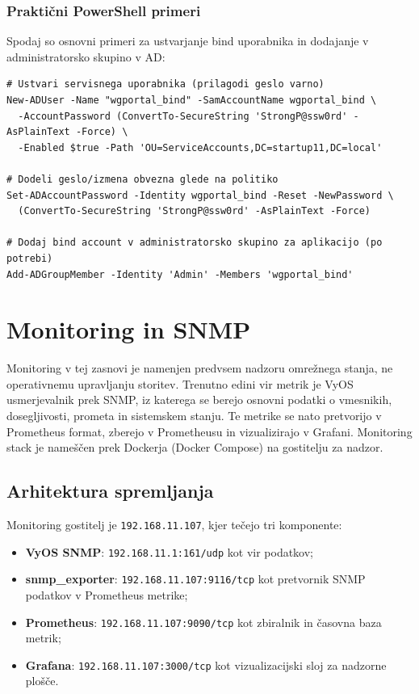 \documentclass[a4paper,11pt]{article}
\begin{document}
\subsubsection{Praktični PowerShell primeri}
Spodaj so osnovni primeri za ustvarjanje bind uporabnika in dodajanje v administratorsko skupino v AD:
\begin{lstlisting}
# Ustvari servisnega uporabnika (prilagodi geslo varno)
New-ADUser -Name "wgportal_bind" -SamAccountName wgportal_bind \
  -AccountPassword (ConvertTo-SecureString 'StrongP@ssw0rd' -AsPlainText -Force) \
  -Enabled $true -Path 'OU=ServiceAccounts,DC=startup11,DC=local'

# Dodeli geslo/izmena obvezna glede na politiko
Set-ADAccountPassword -Identity wgportal_bind -Reset -NewPassword \
  (ConvertTo-SecureString 'StrongP@ssw0rd' -AsPlainText -Force)

# Dodaj bind account v administratorsko skupino za aplikacijo (po potrebi)
Add-ADGroupMember -Identity 'Admin' -Members 'wgportal_bind'
\end{lstlisting}


\section{Monitoring in SNMP}
Monitoring v tej zasnovi je namenjen predvsem nadzoru omrežnega stanja, ne operativnemu upravljanju storitev. Trenutno edini vir metrik je VyOS usmerjevalnik prek SNMP,
iz katerega se berejo osnovni podatki o vmesnikih, dosegljivosti, prometa in sistemskem stanju. Te metrike se nato pretvorijo v Prometheus format, zberejo v Prometheusu in vizualizirajo v Grafani. 
Monitoring stack je nameščen prek Dockerja (Docker Compose) na gostitelju za nadzor.

\subsection{Arhitektura spremljanja}
Monitoring gostitelj je 
\texttt{192.168.11.107}, kjer tečejo tri komponente:
\begin{itemize}
  \item \textbf{VyOS SNMP}: \texttt{192.168.11.1:161/udp} kot vir podatkov;
  \item \textbf{snmp\_exporter}: \texttt{192.168.11.107:9116/tcp} kot pretvornik SNMP podatkov v Prometheus metrike;
  \item \textbf{Prometheus}: \texttt{192.168.11.107:9090/tcp} kot zbiralnik in časovna baza metrik;
  \item \textbf{Grafana}: \texttt{192.168.11.107:3000/tcp} kot vizualizacijski sloj za nadzorne plošče.
\end{itemize}
\end{document}
